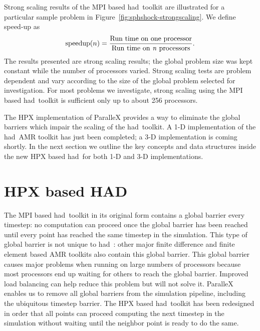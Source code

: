 \documentclass[prd,aps,showpacs,nofootinbib,floats,floatfix,twocolumn,letterpaper]{revtex4}
\newcommand{\had}{{\sc had}}
\begin{document}
Strong scaling results of the MPI based \had\ toolkit are illustrated for a particular sample problem
in Figure~\ref{fig:sphshock-strongscaling}.  We define speed-up as  
\begin{eqnarray*}
{\rm speedup}(n) = \frac{{\rm Run~time~on~one~processor}}{{\rm Run~time~on~{\it n}~processors}}.
\end{eqnarray*}
The results presented are 
strong scaling results; the global problem size was kept constant while the
number of processors varied.  Strong scaling tests are problem dependent and vary
according to the size of the global problem selected for investigation.  For most problems
we investigate, strong scaling using the MPI based \had\ toolkit is sufficient only up to about 256 processors.

The HPX implementation of ParalleX provides a way to eliminate the global barriers which 
impair the scaling of the \had\ toolkit.   A 1-D implementation of the \had\ AMR toolkit has
just been completed; a 3-D implementation is coming shortly.  In the next section we 
outline the key concepts and data structures inside the new HPX based \had\ 
for both 1-D and 3-D implementations.


%
%
\section{HPX based HAD}

The MPI based \had\ toolkit in its original form contains a global barrier every timestep: no
computation can proceed once the global barrier has been reached until every point has reached
the same timestep in the simulation.  This type of global barrier is not unique to \had\ : other
major finite difference and finite element based AMR toolkits also contain this global barrier.
This global barrier causes major problems when running on large numbers of processors because
most processors end up waiting for others to reach the global barrier.  Improved load balancing
can help reduce this problem but will not solve it.  ParalleX enables us to remove all 
global barriers from the simulation pipeline, including the ubiquitous timestep barrier.  The
HPX based \had\ toolkit has been redesigned in order that all points can proceed computing the next
timestep in the simulation without waiting until the neighbor point is ready to do the same. 
\end{document}
